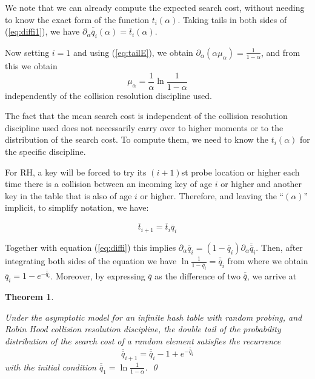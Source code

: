 \documentclass[proceedings]{aofa}
\newtheorem{theorem}{Theorem}
\newcommand{\tail}[1]{\overline{#1}}
\newcommand{\ttail}[1]{\tail{\tail{#1}}}
\begin{document}
We note that we can already compute the expected search cost, without needing to know the exact form of the function $t_i(\alpha)$.
Taking tails in both sides of (\ref{eq:diffi1}), we have
$\partial_{\alpha} \ttail{q}_i(\alpha) =
\tail{t}_i(\alpha)$.

Now setting $i=1$ and using (\ref{eq:tailE}), we obtain
$\partial_{\alpha} (\alpha\mu_{\alpha}) = \frac{1}{1-\alpha}$,
and from this we obtain
\begin{equation}
\label{eq:mu}
\mu_{\alpha} = \frac{1}{\alpha}\ln{\frac{1}{1-\alpha}}
\end{equation}
independently of the collision resolution discipline used.


The fact that the mean search cost is independent of the collision resolution discipline used does not necessarily carry over to higher moments or to the distribution of the search cost. To compute them, we need to know the $t_i(\alpha)$ for the specific discipline.


For RH, a key will be forced to try its $(i+1)$st probe location or higher each time there is a collision between an incoming key of age $i$ or higher and another key in the table that is also of age $i$ or higher. Therefore, and leaving the ``$(\alpha)$'' implicit, to simplify notation, we have:

\begin{equation}
\label{eq:qiti}
\tail{t}_{i+1} = \tail{t}_i  \tail{q}_i
\end{equation}

Together with equation (\ref{eq:diffi}) this implies
$\partial_{\alpha} \tail{q}_i = (1-\tail{q}_i)
\partial_{\alpha} \ttail{q}_i$.
Then, after integrating both sides of the equation
we have
$\ln \frac{1}{1-\tail{q}_i} = \ttail{q}_i$
from where we obtain
$\tail{q}_i = 1 - e^{-\ttail{q}_i}$.
Moreover, by expressing $\tail{q}$ as the difference
of two $\ttail{q}$, we arrive at
\begin{theorem}\label{theorem:RH}

Under the asymptotic model for an infinite hash table with random probing, and Robin Hood collision resolution discipline, the double tail of the probability distribution of the search cost of a random element satisfies the recurrence
\begin{equation}\label{eq:recurRH}
\ttail{q}_{i+1} = \ttail{q}_i - 1 + e^{-\ttail{q}_i}
\end{equation}
with the initial condition $\ttail{q}_1=\ln \frac{1}{1-\alpha}$. \qed
\end{theorem}
\end{document}
